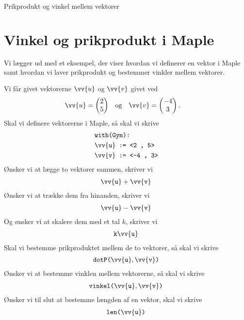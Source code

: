 
\begin{center}
	\Huge
	Prikprodukt og vinkel mellem vektorer
\end{center}

\section*{Vinkel og prikprodukt i Maple}

Vi lægger ud med et eksempel, der viser hvordan vi definerer en vektor i Maple samt hvordan vi laver prikprodukt og bestemmer vinkler mellem vektorer.

\begin{exa}
	Vi får givet vektorerne $\vv{u}$ og $\vv{v}$ givet ved
	\begin{align*}
		&\vv{u} = 
		\begin{pmatrix} 
			2 \\ 5
		\end{pmatrix} & &\textnormal{og} & & 
		\vv{v} = 
		\begin{pmatrix}
			-4 \\ 3
		\end{pmatrix}. 
	\end{align*}
	Skal vi definere vektorerne i Maple, så skal vi skrive
	\begin{align*}
		&\texttt{with(Gym):} \\
		&\texttt{$\vv{\texttt{u}}$ := <2 , 5>} \\
		&\texttt{$\vv{\texttt{v}}$ := <-4 , 3>}
	\end{align*}
	Ønsker vi at lægge to vektorer sammen, skriver vi
	\begin{align*}
		\vv{\texttt{u}} + \vv{\texttt{v}}
	\end{align*}
	Ønsker vi at trække dem fra hinanden, skriver vi
	\begin{align*}
		\vv{\texttt{u}} - \vv{\texttt{v}}
	\end{align*}
	Og ønsker vi at skalere dem med et tal $k$, skriver vi
	\begin{align*}
		\texttt{k$\vv{\texttt{u}}$}
	\end{align*}
	Skal vi bestemme prikproduktet mellem de to vektorer, så skal vi skrive
	\begin{align*}
		\texttt{dotP($\vv{\texttt{u}},\vv{\texttt{v}}$)} 
	\end{align*}
	Ønsker vi at bestemme vinklen mellem vektorerne, så skal vi skrive
	\begin{align*}
		\texttt{vinkel($\vv{\texttt{u}},\vv{\texttt{v}}$)}
	\end{align*}
	Ønsker vi til slut at bestemme længden af en vektor, skal vi skrive
	\begin{align*}
		\texttt{len($\vv{\texttt{u}}$)}
	\end{align*}
\end{exa}

